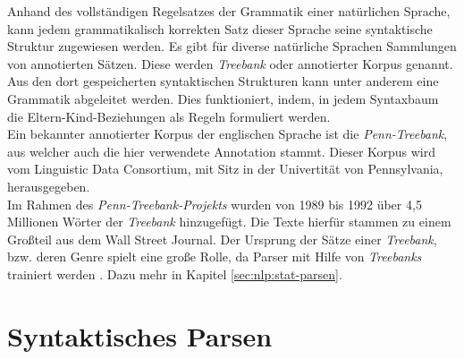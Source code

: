 Anhand des vollständigen Regelsatzes der Grammatik einer natürlichen Sprache, kann jedem grammatikalisch korrekten Satz dieser Sprache seine syntaktische Struktur zugewiesen werden. Es gibt für diverse natürliche Sprachen Sammlungen von annotierten Sätzen. Diese werden \textit{Treebank} oder annotierter Korpus genannt. Aus den dort gespeicherten syntaktischen Strukturen kann unter anderem eine Grammatik abgeleitet werden. Dies funktioniert, indem, in jedem Syntaxbaum die Eltern-Kind-Beziehungen als Regeln formuliert werden.\\
Ein bekannter annotierter Korpus der englischen Sprache ist die \textit{Penn-Treebank}, aus welcher auch die hier verwendete Annotation stammt. Dieser Korpus wird vom Linguistic Data Consortium, mit Sitz in der Univertität von Pennsylvania, herausgegeben. \cite{ldc} \\ %
Im Rahmen des \textit{Penn-Treebank-Projekts} wurden von 1989 bis 1992 über 4,5 Millionen Wörter der \textit{Treebank} hinzugefügt. Die Texte hierfür stammen zu einem Großteil aus dem Wall Street Journal. Der Ursprung der Sätze einer \textit{Treebank}, bzw. deren Genre spielt eine große Rolle, da Parser mit Hilfe von \textit{Treebanks} trainiert werden \cite{ptbInformationen}. Dazu mehr in Kapitel \ref{sec:nlp:stat-parsen}.  %

\section{Syntaktisches Parsen}
\label{sec:nlp:syn-parsen}

